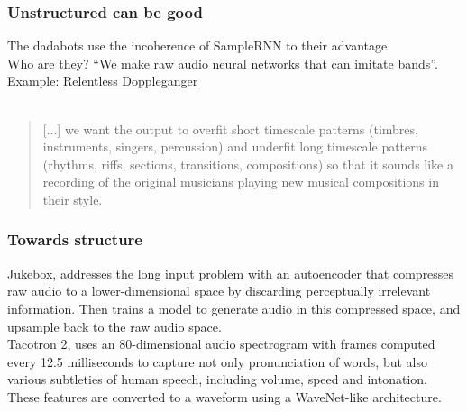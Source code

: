 \documentclass{beamer}
\begin{document}

\begin{frame}
	\frametitle{Unstructured can be good}
	The dadabots use the incoherence of SampleRNN to their advantage\\
	Who are they? ``We make raw audio neural networks that can imitate bands''. Example: \href{https://www.youtube.com/watch?v=MwtVkPKx3RA}{Relentless Doppleganger}\\\ \\
	\begin{quote}
		[...] we want the output to overﬁt short timescale patterns (timbres, instruments, singers, percussion) and underﬁt long timescale patterns (rhythms, riffs, sections, transitions, compositions) so that it sounds like a recording of the original musicians playing new musical compositions in their style.
	\end{quote}
\end{frame}


\begin{frame}
	\frametitle{Towards structure}
	Jukebox,  addresses the long input problem with an autoencoder that compresses raw audio to a lower-dimensional space by discarding perceptually irrelevant information. Then trains a model to generate audio in this compressed space, and upsample back to the raw audio space.\\
	\vspace{0.5em}
	Tacotron 2,  uses an 80-dimensional audio spectrogram with frames computed every 12.5 milliseconds to capture not only pronunciation of words, but also various subtleties of human speech, including volume, speed and intonation. These features are converted to a waveform using a WaveNet-like architecture.
\end{frame}
\end{document}
